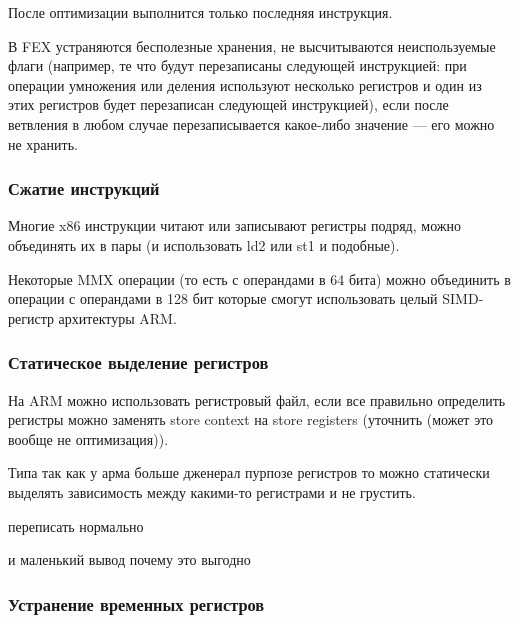 После оптимизации выполнится только последняя инструкция.

В FEX устраняются бесполезные хранения, не высчитываются неиспользуемые флаги (например, те что будут перезаписаны следующей инструкцией: при операции умножения или деления используют несколько регистров и один из этих регистров будет перезаписан следующей инструкцией), если после ветвления в любом случае перезаписывается какое-либо значение --- его можно не хранить.

\subsubsection{Сжатие инструкций}

Многие x86 инструкции читают или записывают регистры подряд, можно объединять их в пары (и использовать ld2 или st1 и подобные).

Некоторые MMX операции (то есть с операндами в 64 бита) можно объединить в операции с операндами в 128 бит которые смогут использовать целый SIMD-регистр архитектуры ARM.

\subsubsection{Статическое выделение регистров}

На ARM можно использовать регистровый файл, если все правильно определить регистры можно заменять store context на store registers (уточнить (может это вообще не оптимизация)).

Типа так как у арма больше дженерал пурпозе регистров то можно статически выделять зависимость между какими-то регистрами и не грустить.

переписать нормально

и маленький вывод почему это выгодно


\subsubsection{Устранение временных регистров}

